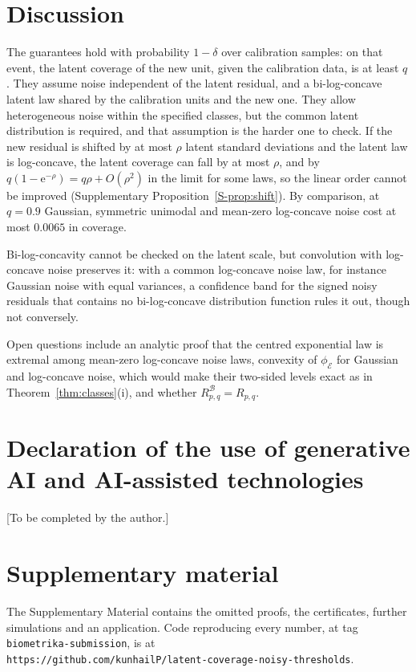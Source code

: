 \documentclass[lineno]{biometrika}
\begin{document}
\section{Discussion}\label{sec:discussion}

The guarantees hold with probability $1 - \delta$ over calibration samples: on that event, the latent coverage of the new unit, given the calibration data, is at least $q$. They assume noise independent of the latent residual, and a bi-log-concave latent law shared by the calibration units and the new one. They allow heterogeneous noise within the specified classes, but the common latent distribution is required, and that assumption is the harder one to check. If the new residual is shifted by at most $\rho$ latent standard deviations and the latent law is log-concave, the latent coverage can fall by at most $\rho$, and by $q(1 - \mathrm{e}^{-\rho}) = q\rho + O(\rho^2)$ in the limit for some laws, so the linear order cannot be improved (Supplementary Proposition~\ref{S-prop:shift}). By comparison, at $q = 0.9$ Gaussian, symmetric unimodal and mean-zero log-concave noise cost at most $0.0065$ in coverage.

Bi-log-concavity cannot be checked on the latent scale, but convolution with log-concave noise preserves it: with a common log-concave noise law, for instance Gaussian noise with equal variances, a confidence band for the signed noisy residuals that contains no bi-log-concave distribution function \citep{dumbgen2017} rules it out, though not conversely.

Open questions include an analytic proof that the centred exponential law is extremal among mean-zero log-concave noise laws, convexity of $\phi_{\mathcal E}$ for Gaussian and log-concave noise, which would make their two-sided levels exact as in Theorem~\ref{thm:classes}(i), and whether $R^{\mathcal B}_{p,q} = R_{p,q}$.

\section*{Declaration of the use of generative AI and AI-assisted technologies}

[To be completed by the author.]

\section*{Supplementary material}\label{SM}

The Supplementary Material contains the omitted proofs, the certificates, further simulations and an application. Code reproducing every number, at tag \texttt{biometrika-submission}, is at\\ \texttt{https://github.com/kunhailP/latent-coverage-noisy-thresholds}.



\end{document}
